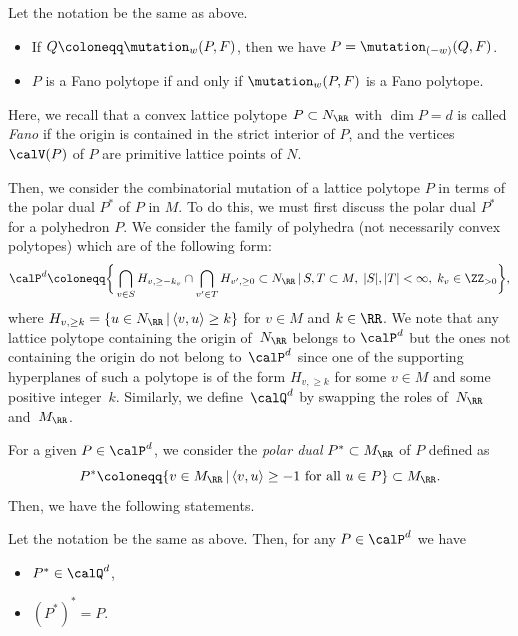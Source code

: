\begin{Proposition}\label{properties_mutation_polygon}
Let the notation be the same as above.
\begin{itemize}\itemsep=0pt
\item[\rm (1)] If $Q\coloneqq\mutation_w(P,F)$, then we have $P=\mutation_{(-w)}(Q,F)$.
\item[\rm (2)] $P$ is a Fano polytope if and only if $\mutation_w(P,F)$ is a Fano polytope.
\end{itemize}
\end{Proposition}

Here, we recall that a convex lattice polytope $P\subset N_\RR$ with $\dim P=d$ is called \emph{Fano} if the origin is contained in the strict interior of $P$,
and the vertices $\calV(P)$ of $P$ are primitive lattice points of $N$.

Then, we consider the combinatorial mutation of a lattice polytope $P$ in terms of the polar dual $P^*$ of $P$ in $M$.
To do this, we must first discuss the polar dual $P^*$ for a polyhedron $P$.
We consider the family of polyhedra (not necessarily convex polytopes) which are of the following form:
\begin{displaymath}
\calP^d \coloneqq \bigg\{ \bigcap_{v \in S} H_{v,\geq -k_v} \cap \bigcap_{v' \in T}H_{v',\geq 0} \subset N_\RR \,|\, S,T \subset M, \; |S|, |T| < \infty, \; k_v \in \ZZ_{>0} \bigg\},
\end{displaymath}
where $H_{v,\geq k}=\{u \in N_\RR \,|\, \langle v,u \rangle \geq k\}$ for $v \in M$ and $k \in \RR$.
We note that any lattice polytope containing the origin of~$N_\RR$ belongs to $\calP^d$ but the ones not containing the origin do not belong to~$\calP^d$
since one of the supporting hyperplanes of such a polytope is of the form $H_{v, \geq k}$ for some $v \in M$ and some positive integer~$k$.
Similarly, we define~$\calQ^d$ by swapping the roles of~$N_\RR$ and~$M_\RR$.

For a given $P \in \calP^d$, we consider the \emph{polar dual} $P^* \subset M_\RR$ of $P$ defined as
\begin{displaymath}
P^* \coloneqq \{v \in M_\RR\,|\,\langle v,u\rangle\ge-1 \text{ for all } u\in P\}\subset M_\RR.
\end{displaymath}
Then, we have the following statements.

\begin{Proposition}\label{prop_dual_polytope}
Let the notation be the same as above. Then, for any $P \in \calP^d$ we have
\begin{itemize}\itemsep=0pt
\item[$(i)$] $P^* \in \calQ^d$,
\item[$(ii)$] $(P^*)^*=P$.
\end{itemize}
\end{Proposition}

